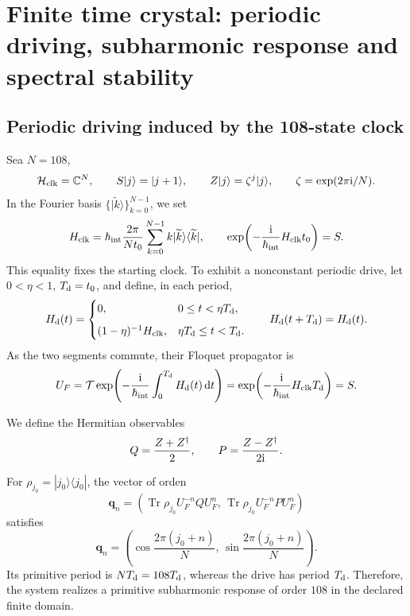 \section{Finite time crystal: periodic driving, subharmonic response and spectral stability}
\label{v:sec:hmtf2-cristal-temporal}

\subsection{Periodic driving induced by the 108-state clock}

Sea \(N=108\),
\[
 \mathcal H_{\rm clk}=\mathbb C^N,\qquad
 S|j\rangle=|j+1\rangle,\qquad
 Z|j\rangle=\zeta^j|j\rangle,\qquad
 \zeta=\exp(2\pi{\rm i}/N).
\]
In the Fourier basis \(\{|\widetilde k\rangle\}_{k=0}^{N-1}\), we set
\[
 H_{\rm clk}
 =\hbar_{\rm int}\frac{2\pi}{Nt_0}
 \sum_{k=0}^{N-1}k|\widetilde k\rangle\langle\widetilde k|,
 \qquad
 \exp\!\left(-\frac{{\rm i}}{\hbar_{\rm int}}H_{\rm clk}t_0\right)=S.
\]
This equality fixes the starting clock. To exhibit a nonconstant
periodic drive, let \(0<\eta<1\), \(T_{\rm d}=t_0\), and
define, in each period,
\[
 H_{\rm d}(t)=
 \begin{cases}
  0,&0\leq t<\eta T_{\rm d},\\[2mm]
  (1-\eta)^{-1}H_{\rm clk},
  &\eta T_{\rm d}\leq t<T_{\rm d}.
 \end{cases}
 \qquad H_{\rm d}(t+T_{\rm d})=H_{\rm d}(t).
\]
As the two segments commute, their Floquet propagator is
\[
 U_F
 =\mathcal T\exp\!\left(
 -\frac{{\rm i}}{\hbar_{\rm int}}\int_0^{T_{\rm d}}H_{\rm d}(t)\,\mathrm dt
 \right)
 =\exp\!\left(-\frac{{\rm i}}{\hbar_{\rm int}}H_{\rm clk}T_{\rm d}\right)
 =S.
\]

We define the Hermitian observables
\[
 Q=\frac{Z+Z^\dagger}{2},
 \qquad
 P=\frac{Z-Z^\dagger}{2{\rm i}}.
\]

\begin{theorem}
\label{v:thm:hmtf2-subarmonia-108}
For \(\rho_{j_0}=|j_0\rangle\langle j_0|\), the vector of orden
\[
 \mathbf q_n
 =\left(
 \operatorname{Tr}\rho_{j_0}U_F^{-n}QU_F^n,\,
 \operatorname{Tr}\rho_{j_0}U_F^{-n}PU_F^n
 \right)
\]
satisfies
\[
 \mathbf q_n
 =\left(
 \cos\frac{2\pi(j_0+n)}N,\,
 \sin\frac{2\pi(j_0+n)}N
 \right).
\]
Its primitive period is \(N T_{\rm d}=108T_{\rm d}\), whereas the drive
has period \(T_{\rm d}\). Therefore, the system realizes a primitive
subharmonic response of order \(108\) in the declared finite domain.
\end{theorem}

